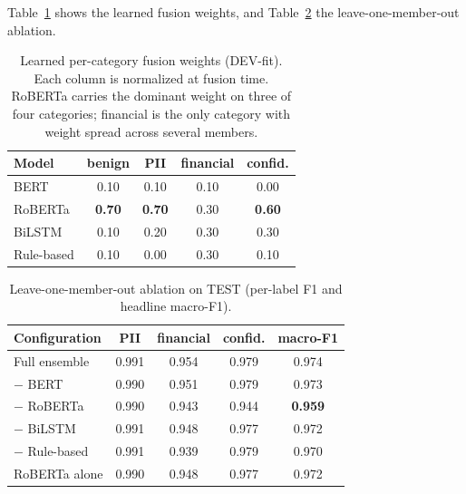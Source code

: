\documentclass{article}
\begin{document}
Table~\ref{tab:weights} shows the learned fusion weights, and
Table~\ref{tab:ablation} the leave-one-member-out ablation.

\begin{table}[t]
\centering
\small
\begin{tabular}{lcccc}
\hline
Model & benign & PII & financial & confid. \\
\hline
BERT       & 0.10 & 0.10 & 0.10 & 0.00 \\
RoBERTa    & \textbf{0.70} & \textbf{0.70} & 0.30 & \textbf{0.60} \\
BiLSTM     & 0.10 & 0.20 & 0.30 & 0.30 \\
Rule-based & 0.10 & 0.00 & 0.30 & 0.10 \\
\hline
\end{tabular}
\caption{Learned per-category fusion weights (DEV-fit). Each column is
normalized at fusion time. RoBERTa carries the dominant weight on three
of four categories; financial is the only category with weight spread
across several members.}
\label{tab:weights}
\end{table}

\begin{table}[t]
\centering
\small
\begin{tabular}{lcccc}
\hline
Configuration & PII & financial & confid. & macro-F1 \\
\hline
Full ensemble        & 0.991 & 0.954 & 0.979 & 0.974 \\
$-$ BERT             & 0.990 & 0.951 & 0.979 & 0.973 \\
$-$ RoBERTa          & 0.990 & 0.943 & 0.944 & \textbf{0.959} \\
$-$ BiLSTM           & 0.991 & 0.948 & 0.977 & 0.972 \\
$-$ Rule-based       & 0.991 & 0.939 & 0.979 & 0.970 \\
RoBERTa alone        & 0.990 & 0.948 & 0.977 & 0.972 \\
\hline
\end{tabular}
\caption{Leave-one-member-out ablation on TEST (per-label F1 and
headline macro-F1).}
\label{tab:ablation}
\end{table}
\end{document}
